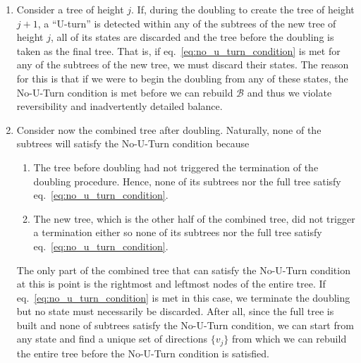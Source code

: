 \begin{enumerate}
    \item Consider a tree of height $j$. If, during the doubling to create the tree of height $j + 1$, a ``U-turn'' is detected within any of the subtrees of the new tree of height $j$, all of its states are discarded and the tree before the doubling is taken as the final tree. That is, if eq.~\eqref{eq:no_u_turn_condition} is met for any of the subtrees of the new tree, we must discard their states. The reason for this is that if we were to begin the doubling from any of these states, the No-U-Turn condition is met before we can rebuild $\mathcal{B}$ and thus we violate reversibility and inadvertently detailed balance.
    \item Consider now the combined tree after doubling. Naturally, none of the subtrees will satisfy the No-U-Turn condition because
    \begin{enumerate}
        \item The tree before doubling had not triggered the termination of the doubling procedure. Hence, none of its subtrees nor the full tree satisfy eq.~\eqref{eq:no_u_turn_condition}. 
        \item The new tree, which is the other half of the combined tree, did not trigger a termination either so none of its subtrees nor the full tree satisfy eq.~\eqref{eq:no_u_turn_condition}.
    \end{enumerate}
    The only part of the combined tree that can satisfy the No-U-Turn condition at this is point is the rightmost and leftmost nodes of the entire tree. If eq.~\eqref{eq:no_u_turn_condition} is met in this case, we terminate the doubling but no state must necessarily be discarded. After all, since the full tree is built and none of subtrees satisfy the No-U-Turn condition, we can start from any state and find a unique set of directions $\{v_j\}$ from which we can rebuild the entire tree before the No-U-Turn condition is satisfied.
\end{enumerate}

